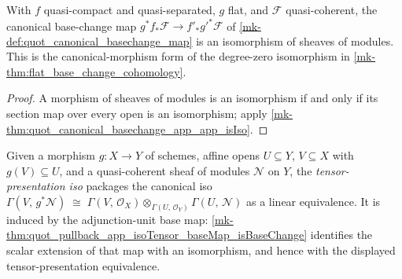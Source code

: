 \begin{theorem}\label{mk-thm:quot_canonical_basechange_isIso}
  \leanok

  With \(f\) quasi-compact and quasi-separated, \(g\) flat, and
  \(\mathcal{F}\) quasi-coherent, the canonical base-change map
  \(g^* f_* \mathcal{F} \to f'_* g'^* \mathcal{F}\) of
  \ref{mk-def:quot_canonical_basechange_map} is an isomorphism of sheaves of
  modules. This is the canonical-morphism form of the degree-zero isomorphism
  in \ref{mk-thm:flat_base_change_cohomology}.
\end{theorem}
\begin{proof}
  \leanok{}
  A morphism of sheaves of modules is an isomorphism if and only if its
  section map over every open is an isomorphism; apply
  \ref{mk-thm:quot_canonical_basechange_app_app_isIso}.
\end{proof}

\begin{definition}\label{mk-def:quot_pullback_app_isoTensor}
  \leanok

  Given a morphism \(g : X \to Y\) of schemes, affine opens
  \(U \subseteq Y\), \(V \subseteq X\) with \(g(V) \subseteq U\), and a
  quasi-coherent sheaf of modules \(\mathcal{N}\) on \(Y\), the
  \emph{tensor-presentation iso} packages the canonical iso
  \(\Gamma(V,\, g^* \mathcal{N}) \;\cong\;
   \Gamma(V,\, \mathcal{O}_X) \otimes_{\Gamma(U,\, \mathcal{O}_Y)}
     \Gamma(U,\, \mathcal{N})\)
  as a linear equivalence. It is induced by the adjunction-unit base map:
  \ref{mk-thm:quot_pullback_app_isoTensor_baseMap_isBaseChange} identifies
  the scalar extension of that map with an isomorphism, and hence with the
  displayed tensor-presentation equivalence.
\end{definition}

